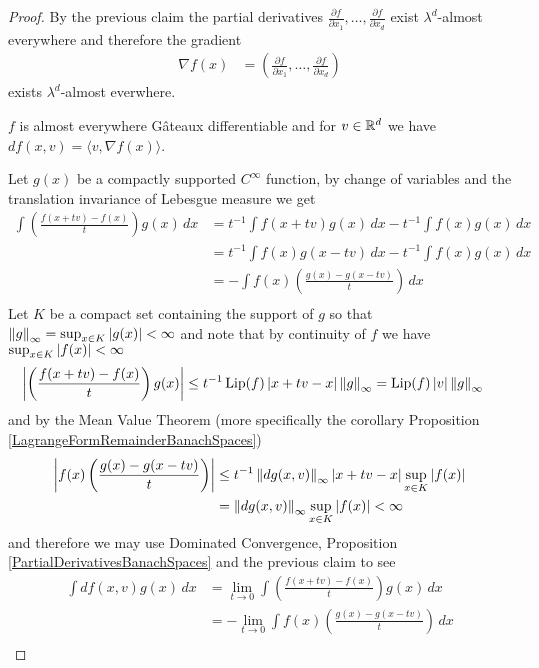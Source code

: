 \begin{proof}
By the previous claim the partial derivatives $\frac{\partial f}{\partial x_1}, \dotsc, \frac{\partial f}{\partial x_d}$ exist $\lambda^d$-almost everywhere and therefore the gradient 
\begin{align*}
\nabla f(x) &= \left( \frac{\partial f}{\partial x_1}, \dotsc, \frac{\partial f}{\partial x_d}\right)
\end{align*}
exists $\lambda^d$-almost everwhere.
\begin{clm} $f$ is almost everywhere G\^{a}teaux differentiable and for $v \in \mathbb{R}^d$ we have $df(x,v) = \langle v, \nabla f(x) \rangle$.
\end{clm}
Let $g(x)$ be a compactly supported $C^\infty$ function, by change of variables and the translation invariance of Lebesgue measure we get
\begin{align*}
\int \left( \frac{f(x+tv) - f(x)}{t} \right) g(x) \, dx &= t^{-1} \int f(x+tv) g(x) \, dx - t^{-1} \int f(x) g(x) \, dx \\
&= t^{-1} \int f(x) g(x-tv) \, dx - t^{-1} \int f(x) g(x) \, dx \\
&= - \int f(x) \left( \frac{g(x) - g(x -tv)}{t} \right) \, dx\\
\end{align*}
Let $K$ be a compact set containing the support of $g$ so that $\left \lVert g \right \rVert_\infty = \sup_{x \in K} \left \vert g(x) \right \vert < \infty$ and note that by continuity of $f$ we have $\sup_{x \in K} \left \vert f(x) \right \vert < \infty$
\begin{align*}
\left \vert \left(\frac{f(x+tv) - f(x)}{t} \right) g(x) \right \vert &\leq t^{-1} \operatorname*{Lip}(f) \left \vert x+tv - x \right \vert \left \lVert g \right \rVert_\infty = \operatorname*{Lip}(f) \left \vert v \right \vert \left \lVert g \right \rVert_\infty 
\end{align*}
and by the Mean Value Theorem (more specifically the corollary Proposition \ref{LagrangeFormRemainderBanachSpaces})
\begin{align*}
\left \vert f(x) \left( \frac{g(x) - g(x-tv)}{t} \right) \right \vert &\leq t^{-1} \left \lVert dg(x,v) \right \rVert_\infty \left \vert x+tv - x \right \vert \sup_{x \in K} \left \vert f(x) \right \vert \\
&= \left \lVert dg(x,v) \right \rVert_\infty \sup_{x \in K} \left \vert f(x) \right \vert< \infty
\end{align*}
and therefore we may use Dominated Convergence, Proposition \ref{PartialDerivativesBanachSpaces} and the previous claim to see
\begin{align*}
\int df(x,v) g(x) \, dx &= \lim_{t \to 0} \int \left( \frac{f(x+tv) - f(x)}{t} \right) g(x) \, dx \\
&= - \lim_{t \to 0} \int  f(x) \left( \frac{g(x) - g(x -tv)}{t} \right) \, dx \\

\end{align*}
\end{proof}
